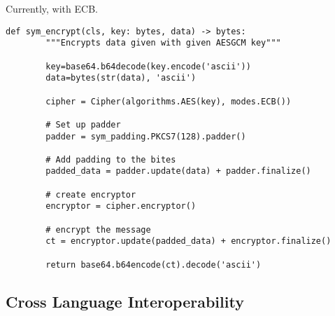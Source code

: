 \documentclass[11pt]{article}
\begin{document}
\begin{Large}
Currently, with ECB.
\end{Large}
\begin{lstlisting}[captionpos=b label=listing:sparql_getallindividuals,
   basicstyle=\ttfamily]
def sym_encrypt(cls, key: bytes, data) -> bytes:
        """Encrypts data given with given AESGCM key"""
 
        key=base64.b64decode(key.encode('ascii'))
        data=bytes(str(data), 'ascii')

        cipher = Cipher(algorithms.AES(key), modes.ECB()) 

        # Set up padder
        padder = sym_padding.PKCS7(128).padder()
        
        # Add padding to the bites
        padded_data = padder.update(data) + padder.finalize() 

        # create encryptor
        encryptor = cipher.encryptor()

        # encrypt the message
        ct = encryptor.update(padded_data) + encryptor.finalize()

        return base64.b64encode(ct).decode('ascii')

\end{lstlisting}


\subsection{Cross Language Interoperability}\label{cross language interoperability}
\end{document}

